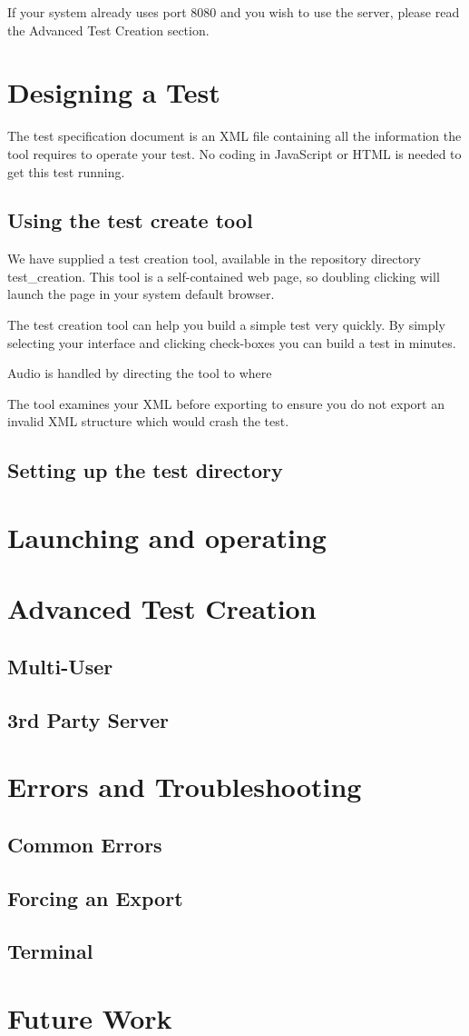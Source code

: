 \documentclass[11pt, oneside]{article}   	%
\begin{document}
If your system already uses port 8080 and you wish to use the server, please read the Advanced Test Creation section.

\section{Designing a Test}

The test specification document is an XML file containing all the information the tool requires to operate your test. No coding in JavaScript or HTML is needed to get this test running.



\subsection{Using the test create tool}
We have supplied a test creation tool, available in the repository directory test\_creation. This tool is a self-contained web page, so doubling clicking will launch the page in your system default browser.

The test creation tool can help you build a simple test very quickly. By simply selecting your interface and clicking check-boxes you can build a test in minutes.

Audio is handled by directing the tool to where

The tool examines your XML before exporting to ensure you do not export an invalid XML structure which would crash the test.

\subsection{Setting up the test directory}

\section{Launching and operating}

\section{Advanced Test Creation}
\subsection{Multi-User}
\subsection{3rd Party Server}

\section{Errors and Troubleshooting}
\subsection{Common Errors}
\subsection{Forcing an Export}
\subsection{Terminal}

\section{Future Work}
\end{document}
